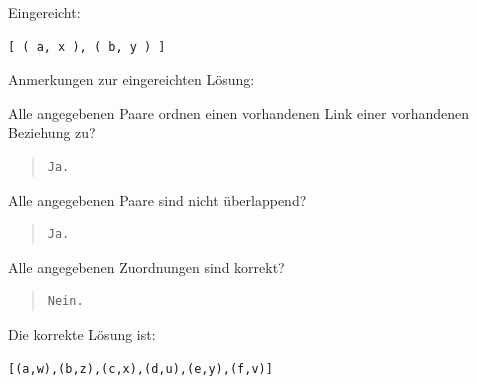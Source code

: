 Eingereicht:


\begin{verbatim}
[ ( a, x ), ( b, y ) ]
\end{verbatim}


Anmerkungen zur eingereichten Lösung:

Alle angegebenen Paare ordnen einen vorhandenen Link einer vorhandenen Beziehung zu?

\begin{quote}
\begin{verbatim}
Ja.
\end{verbatim}
\end{quote}

Alle angegebenen Paare sind nicht überlappend?

\begin{quote}
\begin{verbatim}
Ja.
\end{verbatim}
\end{quote}

Alle angegebenen Zuordnungen sind korrekt?

\begin{quote}
\begin{verbatim}
Nein.
\end{verbatim}
\end{quote}

Die korrekte Lösung ist:
\begin{verbatim}
[(a,w),(b,z),(c,x),(d,u),(e,y),(f,v)]
\end{verbatim}


